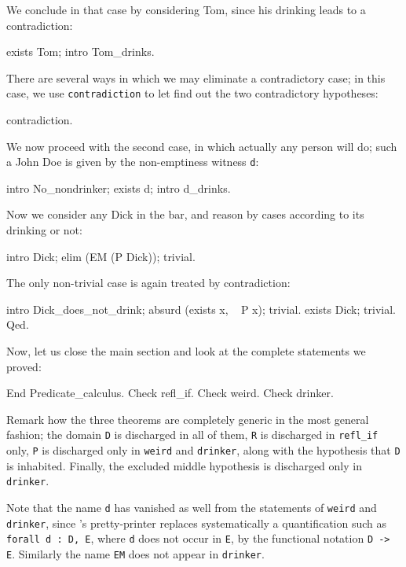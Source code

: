 \documentclass[11pt,a4paper]{book}
\begin{document}
We conclude in that case by considering Tom, since his drinking leads to
a contradiction:
\begin{coq_example}
exists Tom; intro Tom_drinks.
\end{coq_example}

There are several ways in which we may eliminate a contradictory case;
in this case, we use \verb:contradiction: to let \Coq{} find out the
two contradictory hypotheses:
\begin{coq_example}
contradiction.
\end{coq_example}

We now proceed with the second case, in which actually any person will do;
such a John Doe is given by the non-emptiness witness \verb:d::
\begin{coq_example}
intro No_nondrinker; exists d; intro d_drinks.
\end{coq_example}

Now we consider any Dick in the bar, and reason by cases according to its
drinking or not:
\begin{coq_example}
intro Dick; elim (EM (P Dick)); trivial.
\end{coq_example}

The only non-trivial case is again treated by contradiction:
\begin{coq_example}
intro Dick_does_not_drink; absurd (exists x, ~ P x); trivial.
exists Dick; trivial.
Qed.
\end{coq_example}

Now, let us close the main section and look at the complete statements
we proved:
\begin{coq_example}
End Predicate_calculus.
Check refl_if.
Check weird.
Check drinker.
\end{coq_example}

Remark how the three theorems are completely generic in the most general 
fashion;
the domain \verb:D: is discharged in all of them, \verb:R: is discharged in
\verb:refl_if: only, \verb:P: is discharged only in \verb:weird: and
\verb:drinker:, along with the hypothesis that \verb:D: is inhabited. 
Finally, the excluded middle hypothesis is discharged only in 
\verb:drinker:.

Note that the name \verb:d: has vanished as well from
the statements of \verb:weird: and \verb:drinker:, 
since \Coq's pretty-printer replaces
systematically a quantification such as \texttt{forall d : D, E},
where \texttt{d} does not occur in \texttt{E},
by the functional notation \texttt{D -> E}.
Similarly the name \texttt{EM} does not appear in \texttt{drinker}.
\end{document}
